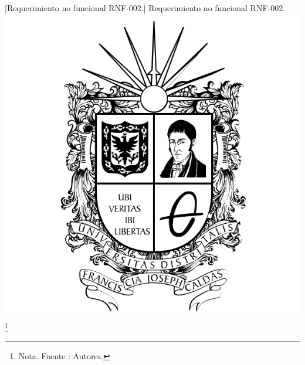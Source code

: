 \begin{itemize}
{\begin{enumerate}
        \vspace{2mm}
        \begin{minipage}{0.9\textwidth}
        \centering
        [{Requerimiento no funcional RNF-002.}]{ Requerimiento no funcional RNF-002. }
        \label{reqnf2}
        \includegraphics[width=1\textwidth]{Content/Images/Escudo_UD.png}
        \footnote{Nota. \textup{Fuente : Autores.}}
        \end{minipage}


\end{enumerate}}
\end{itemize}
